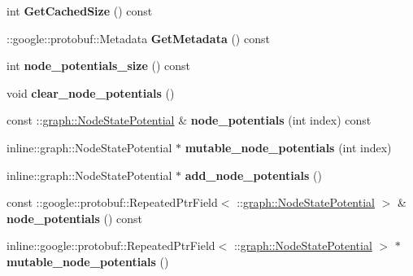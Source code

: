 \begin{DoxyCompactItemize}
\item 
\hypertarget{classgraph_1_1MRFNode_a420b833847841bcbcbbe9baf10d42876}{
int {\bfseries GetCachedSize} () const }
\label{classgraph_1_1MRFNode_a420b833847841bcbcbbe9baf10d42876}

\item 
\hypertarget{classgraph_1_1MRFNode_ad18331d6dffc4a9477fdba263cf9f2fe}{
::google::protobuf::Metadata {\bfseries GetMetadata} () const }
\label{classgraph_1_1MRFNode_ad18331d6dffc4a9477fdba263cf9f2fe}

\item 
\hypertarget{classgraph_1_1MRFNode_aed75e0bf0b6fa5b3ae987510ad1dd75e}{
int {\bfseries node\_\-potentials\_\-size} () const }
\label{classgraph_1_1MRFNode_aed75e0bf0b6fa5b3ae987510ad1dd75e}

\item 
\hypertarget{classgraph_1_1MRFNode_a96a52fa9efd3aa762312bfe27ca05927}{
void {\bfseries clear\_\-node\_\-potentials} ()}
\label{classgraph_1_1MRFNode_a96a52fa9efd3aa762312bfe27ca05927}

\item 
\hypertarget{classgraph_1_1MRFNode_ac1f7d6be6271459b95b37029f8cd31d5}{
const ::\hyperlink{classgraph_1_1NodeStatePotential}{graph::NodeStatePotential} \& {\bfseries node\_\-potentials} (int index) const }
\label{classgraph_1_1MRFNode_ac1f7d6be6271459b95b37029f8cd31d5}

\item 
\hypertarget{classgraph_1_1MRFNode_a9edb6b65ffa1013096b7c47e0efaf0fe}{
inline::graph::NodeStatePotential $\ast$ {\bfseries mutable\_\-node\_\-potentials} (int index)}
\label{classgraph_1_1MRFNode_a9edb6b65ffa1013096b7c47e0efaf0fe}

\item 
\hypertarget{classgraph_1_1MRFNode_ae1315322d7c8e26b8a38cc7ba1bb8d0e}{
inline::graph::NodeStatePotential $\ast$ {\bfseries add\_\-node\_\-potentials} ()}
\label{classgraph_1_1MRFNode_ae1315322d7c8e26b8a38cc7ba1bb8d0e}

\item 
\hypertarget{classgraph_1_1MRFNode_abbecf76da2911c8aa312b7096175c216}{
const ::google::protobuf::RepeatedPtrField$<$ ::\hyperlink{classgraph_1_1NodeStatePotential}{graph::NodeStatePotential} $>$ \& {\bfseries node\_\-potentials} () const }
\label{classgraph_1_1MRFNode_abbecf76da2911c8aa312b7096175c216}

\item 
\hypertarget{classgraph_1_1MRFNode_acb144411ba170fa36398fd55c07b99ca}{
inline::google::protobuf::RepeatedPtrField$<$ ::\hyperlink{classgraph_1_1NodeStatePotential}{graph::NodeStatePotential} $>$ $\ast$ {\bfseries mutable\_\-node\_\-potentials} ()}
\label{classgraph_1_1MRFNode_acb144411ba170fa36398fd55c07b99ca}


\end{DoxyCompactItemize}
